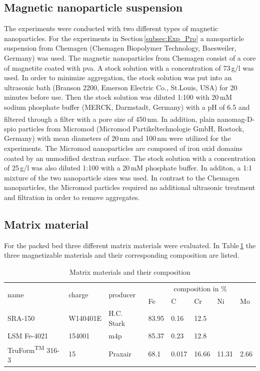 \subsection{Magnetic nanoparticle suspension}
\label{subsec:Mag_nanoparticles}
The experiments were conducted with two different types of magnetic nanoparticles. For the experiments in Section\,\ref{subsec:Exp_Pro} a nanoparticle suspension from Chemagen (Chemagen Biopolymer Technology, Baesweiler, Germany) was used. The magnetic nanoparticles from Chemagen consist of a core of magnetite coated with \gls{pva}. A stock solution with a concentration of 73\,g/l was used. In order to minimize aggregation, the stock solution was put into an ultrasonic bath (Branson 2200, Emerson Electric Co., St.Louis, USA) for 20 minutes before use. Then the stock solution was diluted 1:100 with 20\,mM sodium phosphate buffer (MERCK, Darmstadt, Germany) with a pH of 6.5 and filtered through a filter with a pore size of 450\,nm.\newline 
In addition,  plain nanomag\textsuperscript{\textregistered}-D-spio particles from Micromod (Micromod Partikeltechnologie GmbH, Rostock, Germany) with mean diameters of 20\,nm and 100\,nm were utilized for the experiments. The Micromod nanoparticles are composed of iron oxid domains coated by an unmodified dextran surface. The stock solution with a concentration of 25\,g/l was also diluted 1:100 with a 20\,mM phosphate buffer. In additon, a 1:1 mixture of the two nanoparticle sizes was used. In contrast to the Chemagen nanoparticles, the Micromod particles required no additional ultrasonic treatment and filtration in order to remove aggregates.     

\subsection{Matrix material}
\label{subsec:Matrix_mat}
For the packed bed three different matrix materials were evaluated. In Table\,\ref{table:mat_material} the three magnetizable materials and their corresponding composition are listed.    

\begin{table}[H]
\centering
\caption{Matrix materials and their composition}
\label{table:mat_material}
\begin{tabularx}{\textwidth}{XXXXXXXX}\hline
\multirow{2}{*}{name} & \multirow{2}{*}{charge} & \multirow{2}{*}{producer} & \multicolumn{5}{c}{composition in \%}  \\
& & & Fe & C & Cr & Ni & Mo \\
\hline\hline
SRA-150 & W140401E & H.C. Stark & 83.95 & 0.16 & 12.5  & & \\
LSM Fe-4021 & 154001 & m4p & 85.37 & 0.23 & 12.8 & & \\
TruForm\textsuperscript{TM} 316-3 & 15 & Praxair & 68.1 & 0.017 & 16.66 &11.31& 2.66\\
\hline
\end{tabularx}
\end{table}


